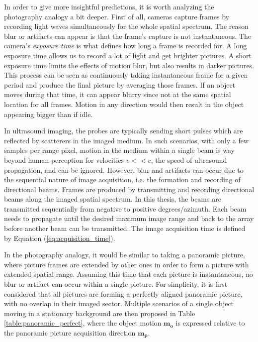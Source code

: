 In order to give more insightful predictions, it is worth analyzing the photography analogy a bit deeper. First of all, cameras capture frames by recording light waves simultaneously for the whole spatial spectrum. The reason blur or artifacts can appear is that the frame's capture is not instantaneous. The camera's \textit{exposure time} is what defines how long a frame is recorded for. A long exposure time allows us to record a lot of light and get brighter pictures. A short exposure time limits the effects of motion blur, but also results in darker pictures. This process can be seen as continuously taking instantaneous frame for a given period and produce the final picture by averaging those frames. If an object moves during that time, it can appear blurry since not at the same spatial location for all frames. Motion in any direction would then result in the object appearing bigger than if idle. 

In ultrasound imaging, the probes are typically sending short pulses which are reflected by scatterers in the imaged medium. In such scenarios, with only a few samples per range pixel, motion in the medium within a single beam is way beyond human perception for velocities $v << c$, the speed of ultrasound propagation, and can be ignored. However, blur and artifacts can occur due to the sequential nature of image acquisition, i.e. the formation and recording of directional beams. Frames are produced by transmitting and recording directional beams along the imaged spatial spectrum. In this thesis, the beams are transmitted sequentially from negative to positive degrees/azimuth. Each beam needs to propagate until the desired maximum image range and back to the array before another beam can be transmitted. The image acquisition time is defined by Equation (\ref{eq:acquisition_time}).

In the photography analogy, it would be similar to taking a panoramic picture, where picture frames are extended by other ones in order to form a picture with extended spatial range. Assuming this time that each picture is instantaneous, no blur or artifact can occur within a single picture. For simplicity, it is first considered that all pictures are forming a perfectly aligned panoramic picture, with no overlap in their imaged sector. Multiple scenarios of a single object moving in a stationary background are then proposed in Table \ref{table:panoramic_perfect}, where the object motion $\boldsymbol{m_o}$ is expressed relative to the panoramic picture acquisition direction $\boldsymbol{m_p}$.

